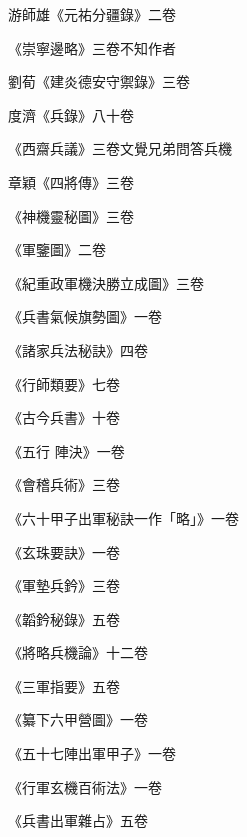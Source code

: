 \begin{pinyinscope}
 游師雄《元祐分疆錄》二卷



 《崇寧邊略》三卷不知作者



 劉荀《建炎德安守禦錄》三卷



 度濟《兵錄》八十卷



 《西齋兵議》三卷文覺兄弟問答兵機



 章穎《四將傳》三卷



 《神機靈秘圖》三卷



 《軍鑒圖》二卷



 《紀重政軍機決勝立成圖》三卷



 《兵書氣候旗勢圖》一卷



 《諸家兵法秘訣》四卷



 《行師類要》七卷



 《古今兵書》十卷



 《五行
 陣決》一卷



 《會稽兵術》三卷



 《六十甲子出軍秘訣一作「略」》一卷



 《玄珠要訣》一卷



 《軍墊兵鈐》三卷



 《韜鈐秘錄》五卷



 《將略兵機論》十二卷



 《三軍指要》五卷



 《纂下六甲營圖》一卷



 《五十七陣出軍甲子》一卷



 《行軍玄機百術法》一卷



 《兵書出軍雜占》五卷




\end{pinyinscope}
